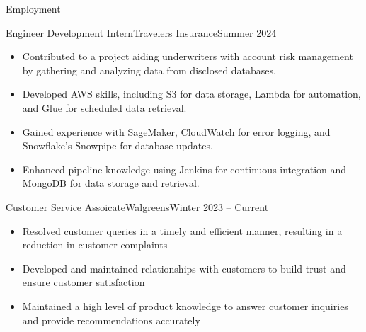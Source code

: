\documentclass[]{mcdowellcv}
\begin{document}
	\makeheader
	
	\begin{cvsection}{Employment}
		\begin{cvsubsection}{Engineer Development Intern}{Travelers Insurance}{Summer 2024}			
			\begin{itemize}
				\item Contributed to a project aiding underwriters with account risk management by gathering and analyzing data from disclosed databases.
				\item Developed AWS skills, including S3 for data storage, Lambda for automation, and Glue for scheduled data retrieval.
				\item Gained experience with SageMaker, CloudWatch for error logging, and Snowflake's Snowpipe for database updates.
				\item Enhanced pipeline knowledge using Jenkins for continuous integration and MongoDB for data storage and retrieval.
			\end{itemize}
		\end{cvsubsection}
		
		\begin{cvsubsection}{Customer Service Assoicate}{Walgreens}{Winter 2023 -- Current}	
			\begin{itemize}
				\item Resolved customer queries in a timely and efficient manner, resulting in a reduction in customer complaints
				\item Developed and maintained relationships with customers to build trust and ensure customer satisfaction
				\item Maintained a high level of product knowledge to answer customer inquiries and provide recommendations accurately
			\end{itemize}
		\end{cvsubsection}
	\end{cvsection}
\end{document}
